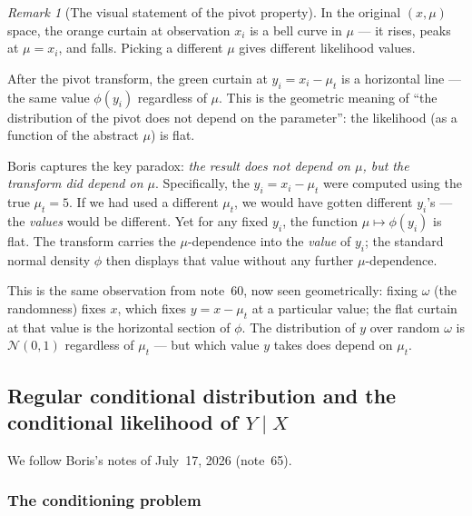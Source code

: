 \documentclass[a4paper,oneside,12pt]{extarticle}
\theoremstyle{plain}
\theoremstyle{definition}
\theoremstyle{remark}
\newtheorem{remark}[proposition]{Remark}
\begin{document}
\begin{remark}[The visual statement of the pivot property]
In the original $(x,\mu)$ space, the orange curtain at observation
$x_i$ is a bell curve in $\mu$ --- it rises, peaks at $\mu = x_i$,
and falls.  Picking a different $\mu$ gives different likelihood
values.

After the pivot transform, the green curtain at $y_i = x_i - \mu_t$
is a horizontal line --- the same value $\phi(y_i)$ regardless of
$\mu$.  This is the geometric meaning of ``the distribution of the
pivot does not depend on the parameter'': the likelihood (as a
function of the abstract $\mu$) is flat.

Boris captures the key paradox: \emph{the result does not depend
on $\mu$, but the transform did depend on $\mu$}.  Specifically,
the $y_i = x_i - \mu_t$ were computed using the true $\mu_t = 5$.
If we had used a different $\mu_t$, we would have gotten different
$y_i$'s --- the \emph{values} would be different.  Yet for any
fixed $y_i$, the function $\mu \mapsto \phi(y_i)$ is flat.  The
transform carries the $\mu$-dependence into the \emph{value} of
$y_i$; the standard normal density $\phi$ then displays that value
without any further $\mu$-dependence.

This is the same observation from note~60, now seen geometrically:
fixing $\omega$ (the randomness) fixes $x$, which fixes $y = x -
\mu_t$ at a particular value; the flat curtain at that value is the
horizontal section of $\phi$.  The distribution of $y$ over random
$\omega$ is $\mathcal{N}(0,1)$ regardless of $\mu_t$ --- but which
value $y$ takes does depend on $\mu_t$.
\end{remark}


\FloatBarrier

\subsection{Regular conditional distribution and the conditional likelihood of \texorpdfstring{$Y \mid X$}{Y|X}}
\label{subsec:rcd-likelihood}

We follow Boris's notes of July~17, 2026 (note~65).

\subsubsection*{The conditioning problem}
\end{document}
